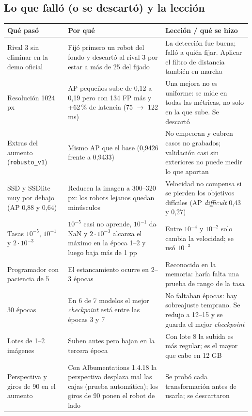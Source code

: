 \documentclass[11pt,a4paper]{article}
\newcommand{\cod}[1]{\texttt{#1}}
\newcommand{\gr}{\textdegree{}}
\begin{document}
\subsection{Lo que falló (o se descartó) y la lección}
\begin{longtable}{@{}P{3.3cm}P{5.2cm}P{6cm}@{}}
\toprule
\textbf{Qué pasó} & \textbf{Por qué} & \textbf{Lección / qué se hizo} \\
\midrule
\endhead
Rival 3 sin eliminar en la demo oficial & Fijó primero un robot del fondo y descartó al rival 3 por estar a más de 25\gr{} del fijado & La detección fue buena; falló a quién fijar. Aplicar el filtro de distancia también en marcha \\
Resolución 1024 px & AP pequeños sube de 0,12 a 0,19 pero con 134 FP más y +62\,\% de latencia (75 $\rightarrow$ 122 ms) & Una mejora no es uniforme: se mide en todas las métricas, no solo en la que sube. Se descartó \\
Extras del aumento (\cod{robusto\_\allowbreak{}v1}) & Mismo AP que el base (0,9426 frente a 0,9433) & No empeoran y cubren casos no grabados; validación casi sin exteriores no puede medir lo que aportan \\
SSD y SSDlite muy por debajo (AP 0,88 y 0,64) & Reducen la imagen a 300--320 px: los robots lejanos quedan minúsculos & Velocidad no compensa si se pierden los objetivos difíciles (AP \emph{difficult} 0,43 y 0,27) \\
Tasas $10^{-5}$, $10^{-1}$ y $2\cdot10^{-3}$ & $10^{-5}$ casi no aprende, $10^{-1}$ da NaN y $2\cdot10^{-3}$ alcanza el máximo en la época 1--2 y luego baja más de 1 pp & Entre $10^{-4}$ y $10^{-2}$ solo cambia la velocidad; se usó $10^{-3}$ \\
Programador con paciencia de 5 & El estancamiento ocurre en 2--3 épocas & Reconocido en la memoria: haría falta una prueba de rango de la tasa \\
30 épocas & En 6 de 7 modelos el mejor \emph{checkpoint} está entre las épocas 3 y 7 & No faltaban épocas: hay sobreajuste temprano. Se redujo a 12--15 y se guarda el mejor \emph{checkpoint} \\
Lotes de 1--2 imágenes & Suben antes pero bajan en la tercera época & Con lote 8 la subida es más regular; es el mayor que cabe en 12 GB \\
Perspectiva y giros de 90\gr{} en el aumento & Con Albumentations 1.4.18 la perspectiva desplaza mal las cajas (prueba automática); los giros de 90\gr{} ponen el robot de lado & Se probó cada transformación antes de usarla; se descartaron \\

\end{longtable}
\end{document}
